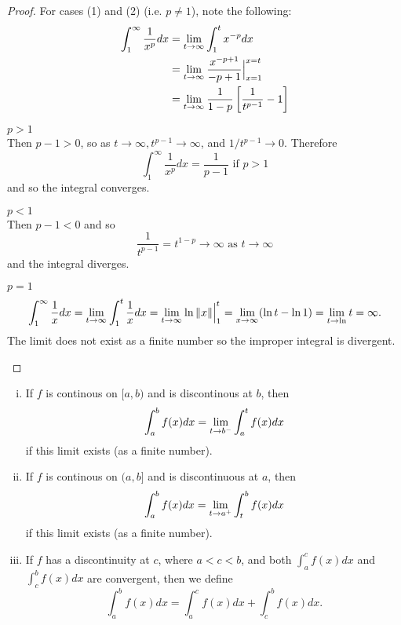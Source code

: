 \documentclass[a4paper,8pt]{article}
\begin{document}
\begin{outline}
    \begin{proof}
      For cases (1) and (2) (i.e. \(p \neq 1\)), note the following:
      \begin{align*}
        \int_1^{\infty}\frac{1}{x^p} dx &= \xlimit{t}{\infty}\int_1^tx^{-p} dx \\
                                        &= \xlimit{t}{\infty}\frac{x^{-p+1}}{-p+1}\Big\vert_{x=1}^{x=t} \\
                                        &= \xlimit{t}{\infty}\frac{1}{1-p}\left[\frac{1}{t^{p-1}}-1\right]
      \end{align*}
      \begin{proofcases}
        \item \(p > 1\)\\
          Then \(p-1 > 0\), so as \(t\rightarrow\infty, t^{p-1}\rightarrow\infty\), and \(1/t^{p-1}\rightarrow 0\).
          Therefore \[ \int_1^{\infty}\frac{1}{x^p}dx = \frac{1}{p-1}\text{ if }p > 1 \] and so the integral converges.
        \item \(p < 1\)\\
          Then \(p-1<0\) and so \[\frac{1}{t^{p-1}} = t^{1-p}\rightarrow\infty\text{ as }t\rightarrow\infty\] and
          the integral diverges.
        \item \(p = 1\)
          \[
            \int_1^{\infty}\frac{1}{x}dx = \xlimit{t}{\infty}\int_1^t\frac{1}{x}dx
                                         = \xlimit{t}{\infty}\ln{\norm{x}}\Big\vert_1^t
                                         = \xlimit{x}{\infty}(\ln{t}-\ln{1})
                                         = \xlimit{t}\ln{t} = \infty\text{.}
          \]
          The limit does not exist as a finite number so the improper integral is divergent.
      \end{proofcases}
    \end{proof}

  \pagebreak
    \begin{enumerate}[i.]
      \item
        If \(f\) is continous on \([a, b)\) and is discontinous at \(b\), then
        \[\int_a^{b}f(x)dx = \xlimit[-]{t}{b}\int_a^t f(x)dx\] if this limit exists (as a finite number).
      \item
        If \(f\) is continous on \((a, b]\) and is discontinuous at \(a\), then
        \[ \int_a^bf(x)dx = \xlimit[+]{t}{a}\int_t^bf(x)dx \] if this limit exists (as a finite number).

      \item
        If \(f\) has a discontinuity at \(c\), where \(a < c < b\), and both \(\int_a^cf(x)dx\) and
        \(\int_c^bf(x)dx\) are convergent, then we define \[\int_a^bf(x)dx = \int_a^cf(x)dx + \int_c^bf(x)dx\text{.}\]
    \end{enumerate}


\end{outline}
\end{document}
